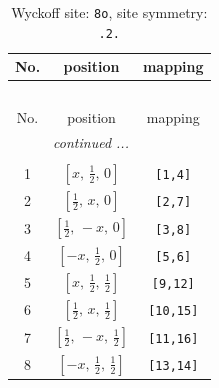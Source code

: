 \documentclass[fleqn,8pt]{jsarticle}
\begin{document}
\begin{longtable}{ccc}
\caption{Wyckoff site: {\tt 8o}, site symmetry: {\tt .2.}}
 \\
 \hline \hline
No. & position & mapping \\ \hline \endfirsthead

\multicolumn{2}{l}{\tablename\ \thetable{}} \\
 \hline \hline
No. & position & mapping \\ \hline \endhead

 \hline \hline
\multicolumn{2}{r}{\footnotesize\it continued ...} \\ \endfoot

 \hline \hline
\multicolumn{2}{r}{} \\ \endlastfoot

1 & $\left[ x,\, \frac{1}{2},\, 0 \right]$ & {\tt [1,4]} \\ \hline
2 & $\left[ \frac{1}{2},\, x,\, 0 \right]$ & {\tt [2,7]} \\ \hline
3 & $\left[ \frac{1}{2},\, - x,\, 0 \right]$ & {\tt [3,8]} \\ \hline
4 & $\left[ - x,\, \frac{1}{2},\, 0 \right]$ & {\tt [5,6]} \\ \hline
5 & $\left[ x,\, \frac{1}{2},\, \frac{1}{2} \right]$ & {\tt [9,12]} \\ \hline
6 & $\left[ \frac{1}{2},\, x,\, \frac{1}{2} \right]$ & {\tt [10,15]} \\ \hline
7 & $\left[ \frac{1}{2},\, - x,\, \frac{1}{2} \right]$ & {\tt [11,16]} \\ \hline
8 & $\left[ - x,\, \frac{1}{2},\, \frac{1}{2} \right]$ & {\tt [13,14]} \\
\end{longtable}
\renewcommand{\arraystretch}{1.2}
\end{document}
